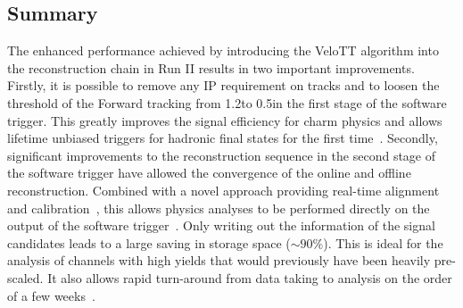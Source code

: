 \subsection{Summary}
\label{sec:up-track-run2:summary}

The enhanced performance achieved by introducing the VeloTT algorithm into the reconstruction chain in Run II results in two important improvements. Firstly, it is possible to remove any IP requirement on \velo tracks and to loosen the \pt threshold of the Forward tracking from 1.2\gevc to 0.5\gevc in the first stage of the software trigger. This greatly improves the signal efficiency for charm physics and allows lifetime unbiased triggers for hadronic final states for the first time~\cite{hlt-runII}. Secondly, significant improvements to the reconstruction sequence in the second stage of the software trigger have allowed the convergence of the online and offline reconstruction. Combined with a novel approach providing real-time alignment and calibration~\cite{alignment}, this allows physics analyses to be performed directly on the output of the software trigger~\cite{turbo}. Only writing out the information of the signal candidates leads to a large saving in storage space ($\sim 90$\%). This is ideal for the analysis of channels with high yields that would previously have been heavily pre-scaled. It also allows rapid turn-around from data taking to analysis on the order of a few weeks~\cite{jpsi-em,charm-em}.
